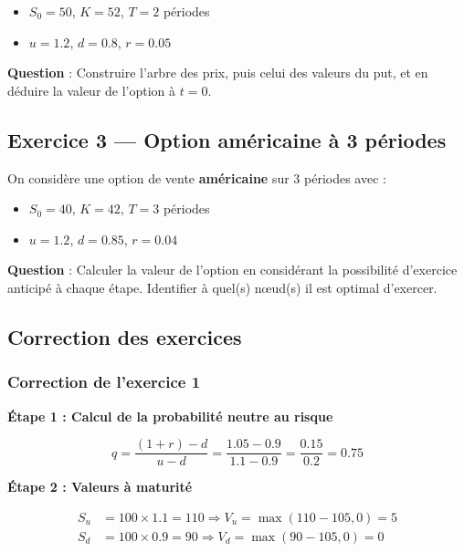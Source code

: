 \documentclass[12pt,a4paper]{article}
\begin{document}
\begin{itemize}
    \item $S_0 = 50$, $K = 52$, $T = 2$ périodes
    \item $u = 1.2$, $d = 0.8$, $r = 0.05$
\end{itemize}

\textbf{Question} : Construire l’arbre des prix, puis celui des valeurs du put, et en déduire la valeur de l’option à $t = 0$.

\vspace{0.3cm}

\subsection*{Exercice 3 — Option américaine à 3 périodes}
On considère une option de vente \textbf{américaine} sur 3 périodes avec :

\begin{itemize}
    \item $S_0 = 40$, $K = 42$, $T = 3$ périodes
    \item $u = 1.2$, $d = 0.85$, $r = 0.04$
\end{itemize}

\textbf{Question} : Calculer la valeur de l’option en considérant la possibilité d’exercice anticipé à chaque étape. Identifier à quel(s) nœud(s) il est optimal d’exercer.

\vspace{1cm}

\subsection*{Correction des exercices}

\subsubsection*{Correction de l’exercice 1}

\textbf{Étape 1 : Calcul de la probabilité neutre au risque}

\[
q = \frac{(1 + r) - d}{u - d} = \frac{1.05 - 0.9}{1.1 - 0.9} = \frac{0.15}{0.2} = 0.75
\]

\textbf{Étape 2 : Valeurs à maturité}

\[
\begin{aligned}
S_u &= 100 \times 1.1 = 110 \Rightarrow V_u = \max(110 - 105, 0) = 5 \\
S_d &= 100 \times 0.9 = 90 \Rightarrow V_d = \max(90 - 105, 0) = 0
\end{aligned}
\]
\end{document}
